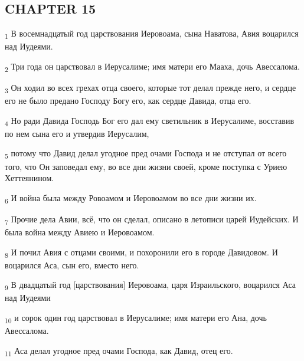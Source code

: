\subsection{CHAPTER 15}
\begin{tcolorbox}
\textsubscript{1} В восемнадцатый год царствования Иеровоама, сына Наватова, Авия воцарился над Иудеями.
\end{tcolorbox}
\begin{tcolorbox}
\textsubscript{2} Три года он царствовал в Иерусалиме; имя матери его Мааха, дочь Авессалома.
\end{tcolorbox}
\begin{tcolorbox}
\textsubscript{3} Он ходил во всех грехах отца своего, которые тот делал прежде него, и сердце его не было предано Господу Богу его, как сердце Давида, отца его.
\end{tcolorbox}
\begin{tcolorbox}
\textsubscript{4} Но ради Давида Господь Бог его дал ему светильник в Иерусалиме, восставив по нем сына его и утвердив Иерусалим,
\end{tcolorbox}
\begin{tcolorbox}
\textsubscript{5} потому что Давид делал угодное пред очами Господа и не отступал от всего того, что Он заповедал ему, во все дни жизни своей, кроме поступка с Уриею Хеттеянином.
\end{tcolorbox}
\begin{tcolorbox}
\textsubscript{6} И война была между Ровоамом и Иеровоамом во все дни жизни их.
\end{tcolorbox}
\begin{tcolorbox}
\textsubscript{7} Прочие дела Авии, всё, что он сделал, описано в летописи царей Иудейских. И была война между Авиею и Иеровоамом.
\end{tcolorbox}
\begin{tcolorbox}
\textsubscript{8} И почил Авия с отцами своими, и похоронили его в городе Давидовом. И воцарился Аса, сын его, вместо него.
\end{tcolorbox}
\begin{tcolorbox}
\textsubscript{9} В двадцатый год [царствования] Иеровоама, царя Израильского, воцарился Аса над Иудеями
\end{tcolorbox}
\begin{tcolorbox}
\textsubscript{10} и сорок один год царствовал в Иерусалиме; имя матери его Ана, дочь Авессалома.
\end{tcolorbox}
\begin{tcolorbox}
\textsubscript{11} Аса делал угодное пред очами Господа, как Давид, отец его.
\end{tcolorbox}
